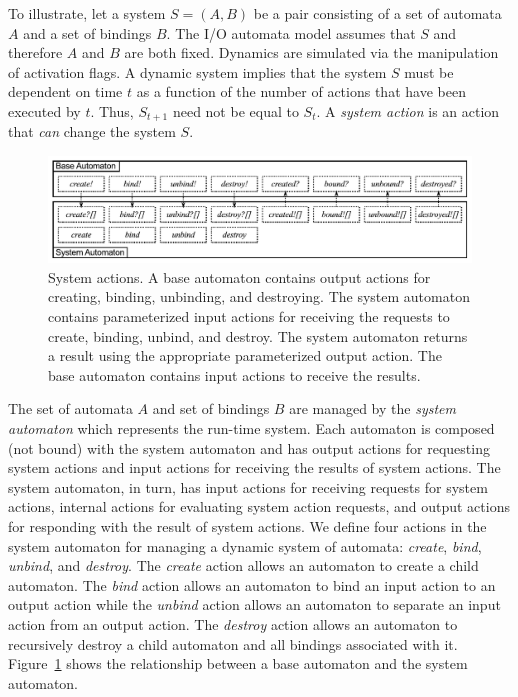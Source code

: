 To illustrate, let a system $S=(A,B)$ be a pair consisting of a set of automata $A$ and a set of bindings $B$.
The I/O automata model assumes that $S$ and therefore $A$ and $B$ are both fixed.
Dynamics are simulated via the manipulation of activation flags.
A dynamic system implies that the system $S$ must be dependent on time $t$ as a function of the number of actions that have been executed by $t$.
Thus, $S_{t+1}$ need not be equal to $S_{t}$.
A \emph{system action} is an action that \emph{can} change the system $S$.

\begin{figure}
\center
\includegraphics[width=\columnwidth]{system_action}
\caption{System actions.
  A base automaton contains output actions for creating, binding, unbinding, and destroying.
  The system automaton contains parameterized input actions for receiving the requests to create, binding, unbind, and destroy.
  The system automaton returns a result using the appropriate parameterized output action.
  The base automaton contains input actions to receive the results.}
\label{system_action}
\end{figure}

The set of automata $A$ and set of bindings $B$ are managed by the \emph{system automaton} which represents the run-time system.
Each automaton is composed (not bound) with the system automaton and has output actions for requesting system actions and input actions for receiving the results of system actions.
The system automaton, in turn, has input actions for receiving requests for system actions, internal actions for evaluating system action requests, and output actions for responding with the result of system actions.
We define four actions in the system automaton for managing a dynamic system of automata: \emph{create}, \emph{bind}, \emph{unbind}, and \emph{destroy}.
The \emph{create} action allows an automaton to create a child automaton.
The \emph{bind} action allows an automaton to bind an input action to an output action while the \emph{unbind} action allows an automaton to separate an input action from an output action.
The \emph{destroy} action allows an automaton to recursively destroy a child automaton and all bindings associated with it.
Figure~\ref{system_action} shows the relationship between a base automaton and the system automaton.

